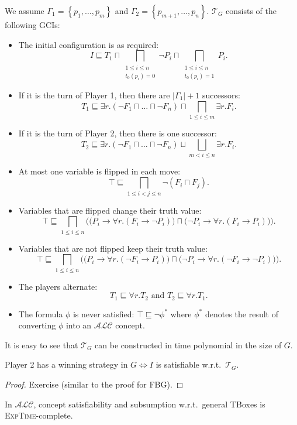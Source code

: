 We assume $\Gamma_1 = \left\{ p_1, \ldots, p_m \right\}$ and $\Gamma_2 = \left\{ p_{m+1}, \ldots, p_n \right\}$.
$\mathcal{T}_G$ consists of the following GCIs:
\begin{itemize}
	\item The initial configuration is as required:
		\[
			I \sqsubseteq T_1 \sqcap \bigsqcap_{\substack{1 \leq i \leq n \\ t_0(p_i) = 0}} \neg P_i \sqcap \bigsqcap_{\substack{1 \leq i \leq n \\ t_0(p_i) = 1}} P_i
		.\]
	\item If it is the turn of Player 1, then there are $\lvert \Gamma_1 \rvert + 1$ successors:
		\[
			T_1 \sqsubseteq \exists r.(\neg F_1 \sqcap \ldots \sqcap \neg F_n) \sqcap \bigsqcap_{1 \leq i \leq m} \exists r.F_i
		.\]
	\item If it is the turn of Player 2, then there is one successor:
		\[
			T_2 \sqsubseteq \exists r.(\neg F_1 \sqcap \ldots \sqcap \neg F_n) \sqcup \bigsqcup_{m < i \leq n} \exists r.F_i
		.\]
	\item At most one variable is flipped in each move:
		\[
			\top \sqsubseteq \bigsqcap_{1 \leq i < j \leq n} \neg (F_i \sqcap F_j)
		.\]
	\item Variables that are flipped change their truth value:
		\[
			\top \sqsubseteq \bigsqcap_{1 \leq i \leq n} \bigg( \big( P_i \to \forall r.(F_i \to \neg P_i) \big) \sqcap \big( \neg P_i \to \forall r.(F_i \to P_i) \big) \bigg)
		.\]
	\item Variables that are not flipped keep their truth value:
		\[
			\top \sqsubseteq \bigsqcap_{1 \leq i \leq n} \bigg( \big( P_i \to \forall r.( \neg F_i \to P_i) \big) \sqcap \big( \neg P_i \to \forall r.(\neg F_i \to \neg P_i) \big) \bigg)
		.\]
		\item The players alternate:
			\[
			T_1 \sqsubseteq \forall r.T_2 \text{ and } T_2 \sqsubseteq \forall r.T_1
			.\]
		\item The formula $\phi$ is never satisfied: $\top \sqsubseteq \neg \phi^*$
			where $\phi^*$ denotes the result of converting $\phi$ into an  $\mathcal{ALC}$ concept.
\end{itemize}
It is easy to see that $\mathcal{T}_G$ can be constructed in time polynomial in the size of $G$.

\begin{lemma}
	Player 2 has a winning strategy in $G \iff I$ is satisfiable w.r.t.\ $\mathcal{T}_G$.
\end{lemma}
\begin{proof}
	Exercise (similar to the proof for FBG).
\end{proof}

\begin{theorem}
	In $\mathcal{ALC}$, concept satisfiability and subsumption w.r.t.\ general TBoxes is \textsc{ExpTime}-complete.
\end{theorem}
